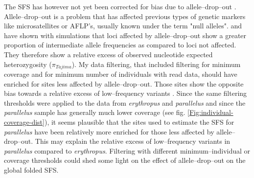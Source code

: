 \documentclass[a4paper,12pt,times,authoryear,twoside,print,index]{Classes/PhDThesisPSnPDF}\usepackage[]{graphicx}\usepackage[]{color}
\begin{document}
The \gls{SFS} has however not yet been corrected for bias due to allele--drop--out \citep{Luca2011, Cariou2016}. Allele--drop--out is a problem that has affected previous types of genetic markers like microsatellites or AFLP's, usually known under the term "null alleles". \cite{Arnold2013} and \cite{Gautier2012} have shown with simulations that loci affected by allele--drop--out show a greater proportion of intermediate allele frequencies as compared to loci not affected. They therefore show a relative excess of observed nucleotide expected heterozygosity ($\pi_{Tajima}$). My data filtering, that included filtering for minimum coverage and for minimum number of individuals with read data, should have enriched for sites less affected by allele--drop--out. Those sites show the opposite bias towards a relative excess of low--frequency variants \citep{Arnold2013}. Since the same filtering thresholds were applied to the data from \textit{erythropus} and \textit{parallelus} and since the \textit{parallelus} sample has generally much lower coverage (see fig. \ref{Fig:individual-coverage-dist}), it seems plausible that the sites used to estimate the \gls{SFS} for \textit{parallelus} have been relatively more enriched for those less affected by allele--drop--out. This may explain the relative excess of low--frequency variants in \textit{parallelus} compared to \textit{erythropus}. Filtering with different minimum--individual or coverage thresholds could shed some light on the effect of allele--drop--out on the global folded \gls{SFS}. 
\end{document}
